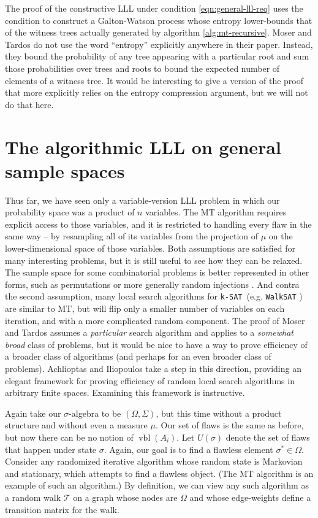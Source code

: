 \documentclass{article}
\newcommand{\ksat}{\texttt{k-SAT}~}
\begin{document}
The proof of the constructive LLL under condition \ref{eqn:general-lll-req} uses the condition to construct a Galton-Watson process whose entropy lower-bounds that of the witness trees actually generated by algorithm \ref{alg:mt-recursive}.  Moser and Tardos do not use the word ``entropy'' explicitly anywhere in their paper.  Instead, they bound the probability of any tree appearing with a particular root and sum those probabilities over trees and roots to bound the expected number of elements of a witness tree.  It would be interesting to give a version of the proof that more explicitly relies on the entropy compression argument, but we will not do that here.

\section{The algorithmic LLL on general sample spaces}
\label{sec:perfect}
Thus far, we have seen only a variable-version LLL problem in which our probability space was a product of $n$ variables.  The MT algorithm requires explicit access to those variables, and it is restricted to handling every flaw in the same way -- by resampling all of its variables from the projection of $\mu$ on the lower-dimensional space of those variables.  Both assumptions are satisfied for many interesting problems, but it is still useful to see how they can be relaxed.  The sample space for some combinatorial problems is better represented in other forms, such as permutations \cite{achlioptas2014random} or more generally random injections \cite{lu2007injections}.  And contra the second assumption, many local search algorithms for \ksat (e.g. \texttt{WalkSAT} \cite{papadimitriou1991selecting}) are similar to MT, but will flip only a smaller number of variables on each iteration, and with a more complicated random component.
The proof of Moser and Tardos assumes a \emph{particular} search algorithm and applies to a \emph{somewhat broad} class of problems, but it would be nice to have a way to prove efficiency of a broader class of algorithms (and perhaps for an even broader class of problems).  Achlioptas and Iliopoulos \cite{achlioptas2014random} take a step in this direction, providing an elegant framework for proving efficiency of random local search algorithms in arbitrary finite spaces.  Examining this framework is instructive.

Again take our $\sigma$-algebra to be $(\Omega, \Sigma)$, but this time without a product structure and without even a measure $\mu$.  Our set of flaws is the same as before, but now there can be no notion of $\operatorname{vbl}(A_i)$.  Let $U(\sigma)$ denote the set of flaws that happen under state $\sigma$.  Again, our goal is to find a flawless element $\sigma^* \in \Omega$.  Consider any randomized iterative algorithm whose random state is Markovian and stationary, which attempts to find a flawless object.  (The MT algorithm is an example of such an algorithm.)  By definition, we can view any such algorithm as a random walk $\mathcal{T}$ on a graph whose nodes are $\Omega$ and whose edge-weights define a transition matrix for the walk.
\end{document}
